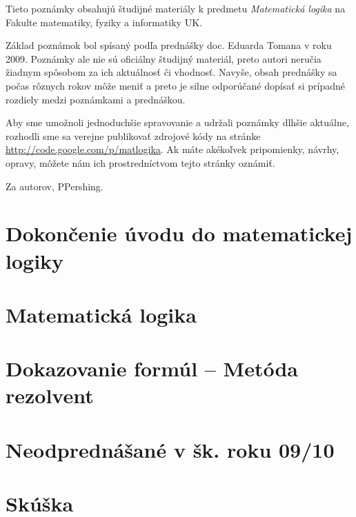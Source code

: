 \documentclass[a4paper]{report}
\begin{document}
Tieto poznámky obsahujú študijné materiály
k predmetu \emph{Matematická logika}
na Fakulte matematiky, fyziky a informatiky UK.

Základ poznámok bol spísaný podľa prednášky doc. Eduarda Tomana v roku 2009.
Poznámky ale nie sú oficiálny študijný materiál, preto autori neručia
žiadnym spôsobom za ich aktuálnosť či vhodnosť. Navyše, obsah prednášky sa
počas rôznych rokov môže meniť a preto je silne odporúčané dopísať si
prípadné rozdiely medzi poznámkami a prednáškou.

Aby sme umožnoli jednoduchšie spravovanie a udržali poznámky dlhšie
aktuálne, rozhodli sme sa verejne publikovať zdrojové kódy na stránke
\url{http://code.google.com/p/matlogika}. Ak máte akékoľvek pripomienky,
návrhy, opravy, môžete nám ich prostredníctvom tejto stránky oznámiť.

Za autorov, PPershing.

\tableofcontents

\chapter{Dokončenie úvodu do matematickej logiky}





\chapter{Matematická logika}





\chapter{Dokazovanie formúl -- Metóda rezolvent}











\chapter{Neodprednášané v šk. roku 09/10}


\chapter{Skúška}

\end{document}
